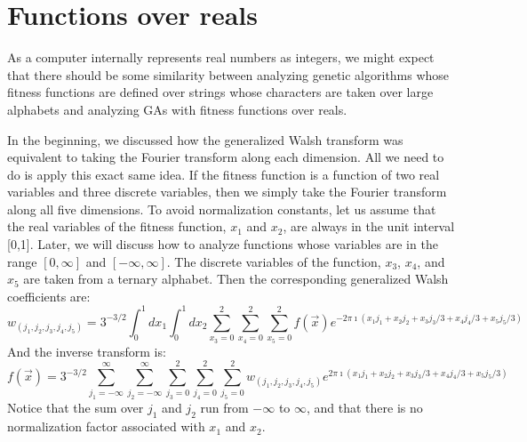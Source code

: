 \section{Functions over reals}
As a computer internally represents real numbers as integers, we might expect
that there should be some similarity between analyzing genetic
algorithms whose fitness functions are defined over
strings whose characters are taken over large alphabets and analyzing
GAs with fitness functions over reals.

In the beginning, we discussed how the generalized Walsh transform
was equivalent to taking the Fourier transform along each dimension.
All we need to do is apply this exact same idea.  If the fitness function
is a function of two real variables and three discrete variables, then
we simply take the Fourier transform along all five dimensions. 
To avoid normalization constants, let us assume that the real variables
of the fitness function, $x_1$ and $x_2$, are always in the unit interval
[0,1].  Later,
we will discuss how to analyze functions whose variables are in the range
$[0,\infty]$ and $[-\infty,\infty]$.  The discrete variables of the
function, $x_3$, $x_4$, and $x_5$ are taken from a ternary alphabet.
Then the corresponding generalized Walsh coefficients are:
\begin{equation}
w_{(j_1,j_2,j_3,j_4,j_5)} = 3^{-3/2}
\int_0^1{dx_1 \int_0^1{dx_2 \sum_{x_3=0}^2{\sum_{x_4=0}^2{\sum_{x_5=0}^2{f(\vec{x})
	e^{-2 \pi \imath (x_1 j_1 + x_2 j_2 + x_3 j_3/3 + x_4 j_4/3 + x_5 j_5/3)}}}}}} 
\end{equation}
And the inverse transform is:
\begin{equation}
f(\vec{x})= 3^{-3/2}
\sum_{j_1=-\infty}^{\infty}{ \sum_{j_2=-\infty}^{\infty}{
	\sum_{j_3=0}^2{ \sum_{j_4=0}^2{ \sum_{j_5=0}^2 {
	w_{(j_1,j_2,j_3,j_4,j_5)}
	e^{2 \pi \imath (x_1 j_1 + x_2 j_2 + x_3 j_3/3 + x_4 j_4/3 + x_5 j_5/3)}}}}}} 
\end{equation}
Notice that the sum over $j_1$ and $j_2$ run from $-\infty$ to $\infty$,
and that there is no normalization factor associated with $x_1$ and $x_2$.

